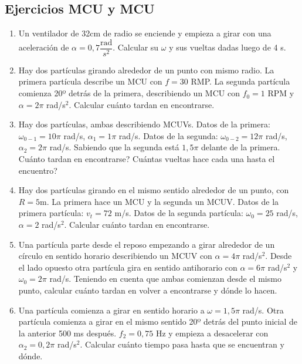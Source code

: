 \subsection*{Ejercicios MCU y MCU}
\begin{enumerate}[label=\arabic*)]

\item Un ventilador de 32cm de radio se enciende y empieza a girar con una aceleración de $\alpha = 0,7 \dfrac{\text{rad}}{s^2}$. Calcular su $\omega$ y sus vueltas dadas luego de 4 s.

\item Hay dos partículas girando alrededor de un punto con mismo radio. La primera partícula describe un MCU con $f = 30$ RMP. La segunda partícula comienza 20º detrás de la primera, describiendo un MCU con $f_0 = 1$ RPM y $\alpha =2\pi$ rad/s$^2$. Calcular cuánto tardan en encontrarse.

\item Hay dos partículas, ambas describiendo MCUVs. Datos de la primera: $\omega_{0-1}=10\pi$ rad/s, $\alpha_1=1\pi$ rad/s. Datos de la segunda: $\omega_{0-2}=12\pi$ rad/s, $\alpha_2=2\pi$ rad/s. Sabiendo que la segunda está $1,5\pi$ delante de la primera. Cuánto tardan en encontrarse? Cuántas vueltas hace cada una hasta el encuentro?

\item Hay dos partículas girando en el mismo sentido alrededor de un punto, con $R=5$m. La primera hace un MCU y la segunda un MCUV. Datos de la primera partícula: $v_t=72$ m/s. Datos de la segunda partícula: $\omega_0=25$ rad/s, $\alpha= 2$ rad/s$^2$. Calcular cuánto tardan en encontrarse.

\item Una partícula parte desde el reposo empezando a girar alrededor de un círculo en sentido horario describiendo un MCUV con $\alpha = 4\pi$ rad/s$^2$. Desde el lado opuesto otra partícula gira en sentido antihorario con $\alpha = 6\pi$ rad/s$^2$ y $\omega_0=2\pi$ rad/s. Teniendo en cuenta que ambas comienzan desde el mismo punto, calcular cuánto tardan en volver a encontrarse y dónde lo hacen.

\item Una partícula comienza a girar en sentido horario a $\omega=1,5\pi$ rad/s. Otra partícula comienza a girar en el mismo sentido 20º detrás del punto inicial de la anterior 500 ms después. $f_2 = 0,75$ Hz y empieza a desacelerar con $\alpha_2 = 0,2\pi$ rad/s$^2$. Calcular cuánto tiempo pasa hasta que se encuentran y dónde.


\end{enumerate}
